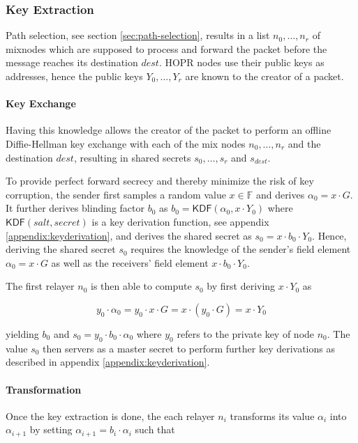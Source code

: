 \subsubsection{Key Extraction}
\label{sec:sphinx:keyderivation}

Path selection, see section \ref{sec:path-selection}, results in a list $n_0, \dots, n_r$ of mixnodes which are supposed to process and forward the packet before the message reaches its destination $dest$. HOPR nodes use their public keys as addresses, hence the public keys $Y_0, \dots , Y_r$ are known to the creator of a packet.

\paragraph{Key Exchange}

Having this knowledge allows the creator of the packet to perform an offline Diffie-Hellman key exchange with each of the mix nodes $n_0 , \dots , n_r$ and the destination $dest$, resulting in shared secrets $s_0, \dots , s_r$ and $s_{dest}$.

To provide perfect forward secrecy and thereby minimize the risk of key corruption, the sender first samples a random value $x \in \mathbb{F}$ and derives $\alpha_0 = x \cdot G$. It further derives blinding factor $b_0$ as $b_0 = \mathsf{KDF}(\alpha_0, x \cdot Y_0)$ where $\mathsf{KDF}(salt, secret)$ is a key derivation function, see appendix \ref{appendix:keyderivation}, and derives the shared secret as $s_0 = x \cdot b_0 \cdot Y_0$. Hence, deriving the shared secret $s_0$ requires the knowledge of the sender's field element $\alpha_0 = x \cdot G$ as well as the receivers' field element $x \cdot b_0 \cdot Y_0$.

The first relayer $n_0$ is then able to compute $s_0$ by first deriving $x \cdot Y_0$ as

$$y_0 \cdot \alpha_0 = y_0 \cdot x \cdot G = x \cdot ( y_0 \cdot G) = x \cdot Y_0$$

yielding $b_0$ and $s_0 = y_0 \cdot b_0 \cdot \alpha_0$ where $y_0$ refers to the private key of node $n_0$. The value $s_0$ then servers as a master secret to perform further key derivations as described in appendix \ref{appendix:keyderivation}.

\paragraph{Transformation}

Once the key extraction is done, the each relayer $n_i$ transforms its value $\alpha_i$ into $\alpha_{i+1}$ by setting $\alpha_{i+1} = b_i \cdot \alpha_i$ such that

